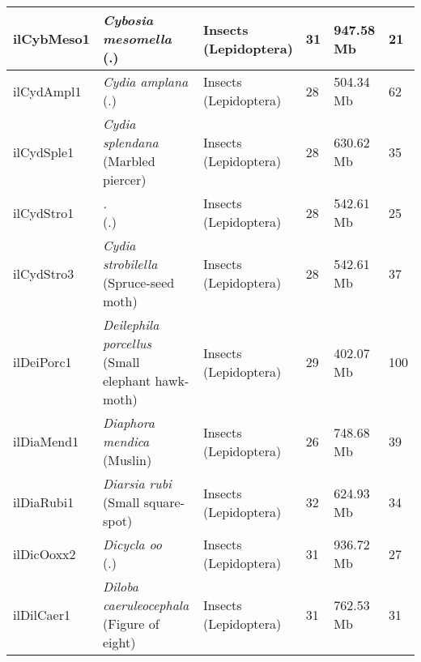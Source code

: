 \begin{centering}
\begin{longtable}{l|l|l|l|l|l}
ilCybMeso1 & \makecell[{l}]{\textit{Cybosia mesomella} \\ (.)} & \makecell[{l}]{Insects \\ (Lepidoptera)} & 31 & 947.58 Mb & 21  \\ \hline
ilCydAmpl1 & \makecell[{l}]{\textit{Cydia amplana} \\ (.)} & \makecell[{l}]{Insects \\ (Lepidoptera)} & 28 & 504.34 Mb & 62  \\ \hline
ilCydSple1 & \makecell[{l}]{\textit{Cydia splendana} \\ (Marbled piercer)} & \makecell[{l}]{Insects \\ (Lepidoptera)} & 28 & 630.62 Mb & 35  \\ \hline
ilCydStro1 & \makecell[{l}]{\textit{.} \\ (.)} & \makecell[{l}]{Insects \\ (Lepidoptera)} & 28 & 542.61 Mb & 25  \\ \hline
ilCydStro3 & \makecell[{l}]{\textit{Cydia strobilella} \\ (Spruce-seed moth)} & \makecell[{l}]{Insects \\ (Lepidoptera)} & 28 & 542.61 Mb & 37  \\ \hline
ilDeiPorc1 & \makecell[{l}]{\textit{Deilephila porcellus} \\ (Small elephant hawk-moth)} & \makecell[{l}]{Insects \\ (Lepidoptera)} & 29 & 402.07 Mb & 100  \\ \hline
ilDiaMend1 & \makecell[{l}]{\textit{Diaphora mendica} \\ (Muslin)} & \makecell[{l}]{Insects \\ (Lepidoptera)} & 26 & 748.68 Mb & 39  \\ \hline
ilDiaRubi1 & \makecell[{l}]{\textit{Diarsia rubi} \\ (Small square-spot)} & \makecell[{l}]{Insects \\ (Lepidoptera)} & 32 & 624.93 Mb & 34  \\ \hline
ilDicOoxx2 & \makecell[{l}]{\textit{Dicycla oo} \\ (.)} & \makecell[{l}]{Insects \\ (Lepidoptera)} & 31 & 936.72 Mb & 27  \\ \hline
ilDilCaer1 & \makecell[{l}]{\textit{Diloba caeruleocephala} \\ (Figure of eight)} & \makecell[{l}]{Insects \\ (Lepidoptera)} & 31 & 762.53 Mb & 31  \\ \hline

\end{longtable}
\end{centering}
